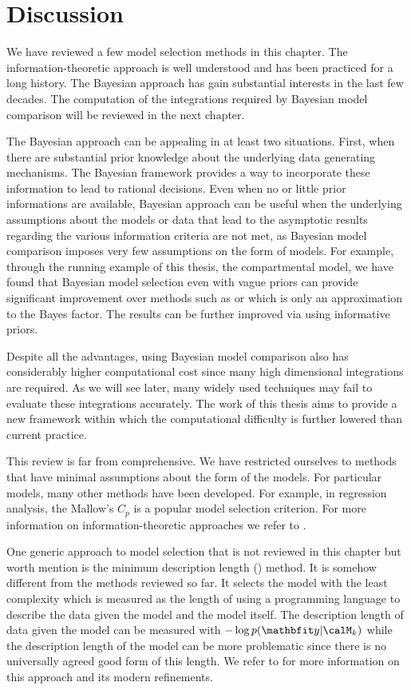 \section{Discussion}
\label{sec:Model Selection Discussion}

We have reviewed a few model selection methods in this chapter. The
information-theoretic approach is well understood and has been practiced for
a long history. The Bayesian approach has gain substantial interests in the
last few decades. The computation of the integrations required by Bayesian
model comparison will be reviewed in the next chapter.

The Bayesian approach can be appealing in at least two situations. First,
when there are substantial prior knowledge about the underlying data
generating mechanisms. The Bayesian framework provides a way to incorporate
these information to lead to rational decisions. Even when no or little prior
informations are available, Bayesian approach can be useful when the
underlying assumptions about the models or data that lead to the asymptotic
results regarding the various information criteria are not met, as Bayesian
model comparison imposes very few assumptions on the form of models. For
example, through the running example of this thesis, the \pet compartmental
model, we have found that Bayesian model selection even with vague priors can
provide significant improvement over methods such as \aicc or \bic which is
only an approximation to the Bayes factor. The results can be further
improved via using informative priors.

Despite all the advantages, using Bayesian model comparison also has
considerably higher computational cost since many high dimensional
integrations are required. As we will see later, many widely used techniques
may fail to evaluate these integrations accurately. The work of this thesis
aims to provide a new framework within which the computational difficulty is
further lowered than current practice.

This review is far from comprehensive. We have restricted ourselves to methods
that have minimal assumptions about the form of the models. For particular
models, many other methods have been developed. For example, in regression
analysis, the Mallow's $C_p$ is a popular model selection criterion. For more
information on information-theoretic approaches we refer to
\cite{Burnham:2002wc,Claeskens:2008tq}.

One generic approach to model selection that is not reviewed in this chapter
but worth mention is the minimum description length (\mdl) method. It is
somehow different from the methods reviewed so far. It selects the model with
the least complexity which is measured as the length of using a programming
language to describe the data given the model and the model itself. The
description length of data given the model can be measured with $-\log
p(\data|\calM_k)$ while the description length of the model can be more
problematic since there is no universally agreed good form of this length. We
refer to \cite{Grunwald:2005vx} for more information on this approach and its
modern refinements.

